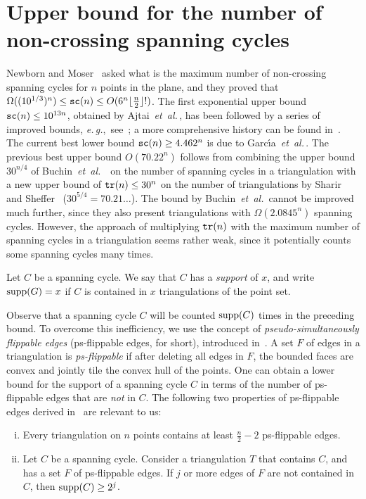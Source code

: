 \documentclass[11pt]{article}
\def\etal{{\it et~al.}\,}
\def\eg{{\it e.\,g.},~}
\newcommand{\supp}{{\rm supp}}
\def\tr{{\tt tr}}
\def\sc{{\tt sc}}
\begin{document}
\section{Upper bound for the number of non-crossing spanning cycles}
\label{sec:cycles}

Newborn and Moser~\cite{NM80} asked what is the maximum number
of non-crossing spanning cycles for $n$ points in the plane, and they proved
that $\Omega((10^{1/3})^n)\leq \sc(n) \leq O(6^n \lfloor\frac{n}{2}\rfloor !)$.
The first exponential upper bound $\sc(n) \leq 10^{13n}$, obtained by
Ajtai~\etal\cite{ACNS82}, has been followed by a series of
improved bounds, \eg see~\cite{BKK+07,D99,SW06}; a more comprehensive history
can be found in~\cite{Dem10}. The current best lower bound
$\sc(n) \geq 4.462^n$ is due to Garc\'{\i}a~\etal\cite{GNT00}.
The previous best upper bound $O(70.22^n)$ follows from combining the
upper bound $30^{n/4}$ of Buchin~\etal~\cite{BKK+07} on the number of
spanning cycles in a triangulation with a new upper bound of $\tr(n) \leq 30^n$
on the number of triangulations by Sharir and Sheffer~\cite{SS10}
($30^{5/4}=70.21\ldots$).
The bound by Buchin~\etal\cite{BKK+07} cannot be improved much further,
since they also present triangulations with $\Omega(2.0845^n)$ spanning cycles.
However, the approach of multiplying $\tr(n)$ with the maximum number
of spanning cycles in a triangulation seems rather weak, since it 
potentially counts some spanning cycles many times.

Let $C$ be a spanning cycle. We say that  $C$ has a \emph{support} of
$x$, and write $\supp(G)=x$ if $C$ is contained in $x$ triangulations
of the point set.

Observe that a spanning cycle $C$ will be counted $\supp(C)$ times in
the preceding bound.
To overcome this inefficiency, we use the concept of \emph{pseudo-simultaneously
flippable edges} (ps-flippable edges, for short), introduced in~\cite{HSSTW11}.
A set $F$ of edges in a triangulation is \emph{ps-flippable} if after
deleting all edges in $F$, the bounded faces are convex and jointly
tile the convex hull of the points.
One can obtain a lower bound for the support of a spanning cycle $C$
in terms of the number of ps-flippable edges that are {\em not} in $C$.
The following two properties of ps-flippable edges derived
in~\cite{HSSTW11} are relevant to us:
\begin{enumerate}[(i)]
\item Every triangulation on $n$ points contains at least
  $\frac{n}{2}-2$ ps-flippable edges. \label{pro:lower}
\item Let $C$ be a spanning cycle. Consider a triangulation $T$ that contains $C$, and
       has a set $F$ of ps-flippable edges. If $j$ or more edges of
       $F$ are not contained in $C$, then $\supp(C) \ge 2^j$.
\end{enumerate}
\end{document}
